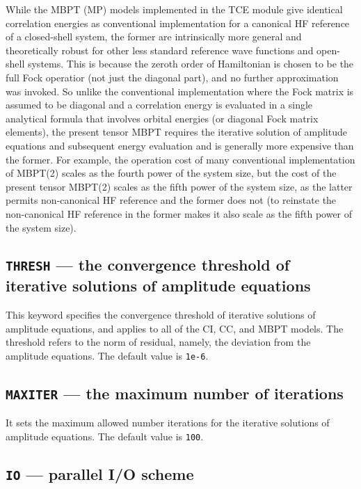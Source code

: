 While the MBPT (MP) models implemented in the TCE module give identical correlation energies as 
conventional implementation for a canonical HF reference of a closed-shell system, the former are intrinsically
more general and theoretically robust for other less standard reference wave functions and open-shell systems.
This is because the zeroth order of Hamiltonian is chosen to be the full Fock operatior (not just the diagonal
part), and no further approximation was invoked.  So unlike the conventional implementation where the Fock
matrix is assumed to be diagonal and a correlation energy is evaluated in a single analytical formula that involves
orbital energies (or diagonal Fock matrix elements), the present tensor MBPT requires the iterative solution
of amplitude equations and subsequent energy evaluation and is generally more expensive than the former.
For example, the operation cost of many conventional implementation of MBPT(2) scales as the fourth power 
of the system size, but the cost of the present tensor MBPT(2) scales as the fifth power of the system size,
as the latter permits non-canonical HF reference and the former does not (to reinstate the non-canonical HF 
reference in the former makes it also scale as the fifth power of the system size).
\subsection{{\tt THRESH} --- the convergence threshold of iterative solutions of amplitude equations}

This keyword specifies the convergence threshold of iterative solutions of amplitude equations,
and applies to all of the CI, CC, and MBPT models.
The threshold refers to the norm of residual,
namely, the deviation from the amplitude equations.
The default value is \verb+1e-6+.

\subsection{{\tt MAXITER} --- the maximum number of iterations}

It sets the maximum allowed number iterations for the iterative solutions of amplitude equations.
The default value is \verb+100+.

\subsection{{\tt IO} --- parallel I/O scheme}

